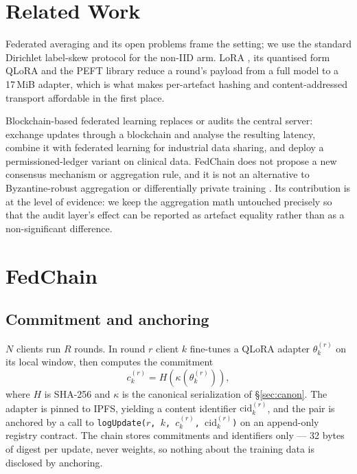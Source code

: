 \documentclass[11pt]{article}
\begin{document}
\section{Related Work}

Federated averaging \cite{mcmahan2017communication} and its open problems \cite{kairouz2021advances} frame the setting; we use the standard Dirichlet label-skew protocol \cite{hsu2019measuring} for the non-IID arm. LoRA \cite{hu2022lora}, its quantised form QLoRA \cite{dettmers2023qlora} and the PEFT library \cite{mangrulkar2022peft} reduce a round's payload from a full model to a 17\,MiB adapter, which is what makes per-artefact hashing and content-addressed transport affordable in the first place.

Blockchain-based federated learning replaces or audits the central server: \citet{kim2020blockchained} exchange updates through a blockchain and analyse the resulting latency, \citet{lu2020blockchain} combine it with federated learning for industrial data sharing, and \citet{warnat2021swarm} deploy a permissioned-ledger variant on clinical data. FedChain does not propose a new consensus mechanism or aggregation rule, and it is not an alternative to Byzantine-robust aggregation \cite{blanchard2017krum} or differentially private training \cite{mcmahan2018learning}. Its contribution is at the level of evidence: we keep the aggregation math untouched precisely so that the audit layer's effect can be reported as artefact equality rather than as a non-significant difference.

\section{FedChain}

\subsection{Commitment and anchoring}

$N$ clients run $R$ rounds. In round $r$ client $k$ fine-tunes a QLoRA adapter $\theta_k^{(r)}$ on its local window, then computes the commitment
\[
c_k^{(r)} = H\!\left(\kappa\!\left(\theta_k^{(r)}\right)\right),
\]
where $H$ is SHA-256 and $\kappa$ is the canonical serialization of \S\ref{sec:canon}. The adapter is pinned to IPFS, yielding a content identifier $\mathrm{cid}_k^{(r)}$, and the pair is anchored by a call to \texttt{logUpdate($r$, $k$, $c_k^{(r)}$, $\mathrm{cid}_k^{(r)}$)} on an append-only registry contract. The chain stores commitments and identifiers only --- 32 bytes of digest per update, never weights, so nothing about the training data is disclosed by anchoring.
\end{document}
